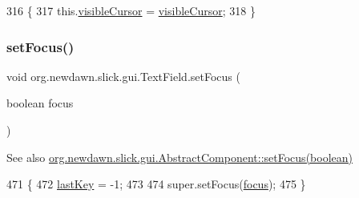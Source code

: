 \begin{DoxyCode}
316                                                         \{
317         this.\mbox{\hyperlink{classorg_1_1newdawn_1_1slick_1_1gui_1_1_text_field_af9a8a737887d06968db25185b999f5d0}{visibleCursor}} = \mbox{\hyperlink{classorg_1_1newdawn_1_1slick_1_1gui_1_1_text_field_af9a8a737887d06968db25185b999f5d0}{visibleCursor}};
318     \}
\end{DoxyCode}
\mbox{\label{classorg_1_1newdawn_1_1slick_1_1gui_1_1_text_field_afc1eb9faa443f02ad96712a334989ad2}} 
\subsubsection{\texorpdfstring{set\+Focus()}{setFocus()}}
{\footnotesize\ttfamily void org.\+newdawn.\+slick.\+gui.\+Text\+Field.\+set\+Focus (\begin{DoxyParamCaption}\item[{boolean}]{focus }\end{DoxyParamCaption})\hspace{0.3cm}{\ttfamily [inline]}}

\begin{DoxySeeAlso}{See also}
\mbox{\hyperlink{classorg_1_1newdawn_1_1slick_1_1gui_1_1_abstract_component_a92a19e06c7872abfb02d7e6625f449eb}{org.\+newdawn.\+slick.\+gui.\+Abstract\+Component\+::set\+Focus(boolean)}} 
\end{DoxySeeAlso}

\begin{DoxyCode}
471                                         \{
472         \mbox{\hyperlink{classorg_1_1newdawn_1_1slick_1_1gui_1_1_text_field_a892f3c9dde2258a7d46f300df3955c64}{lastKey}} = -1;
473         
474         super.setFocus(\mbox{\hyperlink{classorg_1_1newdawn_1_1slick_1_1gui_1_1_abstract_component_a9a7b67f481728081895d167e792aaa74}{focus}});
475     \}
\end{DoxyCode}
\mbox{\label{classorg_1_1newdawn_1_1slick_1_1gui_1_1_text_field_a229334a6273b95ffb76feb05fa994e96}} 
